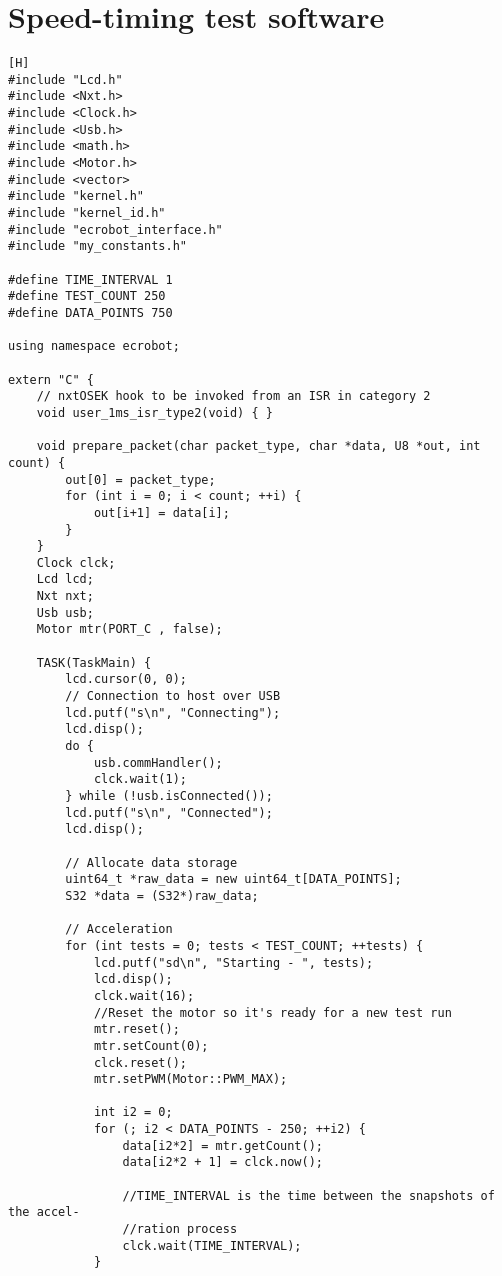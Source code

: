 \chapter{Speed-timing test software}
\begin{lstlisting}[language=inc_cpp, caption={Speed-Timing Test software}, label=lst_speed_timing][H]
#include "Lcd.h"
#include <Nxt.h>
#include <Clock.h>
#include <Usb.h>
#include <math.h>
#include <Motor.h>
#include <vector>
#include "kernel.h"
#include "kernel_id.h"
#include "ecrobot_interface.h"
#include "my_constants.h"

#define TIME_INTERVAL 1
#define TEST_COUNT 250
#define DATA_POINTS 750

using namespace ecrobot;

extern "C" {
    // nxtOSEK hook to be invoked from an ISR in category 2
    void user_1ms_isr_type2(void) { }
    
    void prepare_packet(char packet_type, char *data, U8 *out, int count) {
        out[0] = packet_type;
        for (int i = 0; i < count; ++i) {
            out[i+1] = data[i];
        }
    }
    Clock clck;
    Lcd lcd;
    Nxt nxt;
    Usb usb;
    Motor mtr(PORT_C , false);

    TASK(TaskMain) {
        lcd.cursor(0, 0);
        // Connection to host over USB
        lcd.putf("s\n", "Connecting");
        lcd.disp();
        do {
            usb.commHandler();
            clck.wait(1);
        } while (!usb.isConnected());
        lcd.putf("s\n", "Connected");
        lcd.disp();
        
        // Allocate data storage
        uint64_t *raw_data = new uint64_t[DATA_POINTS];
        S32 *data = (S32*)raw_data;

        // Acceleration
        for (int tests = 0; tests < TEST_COUNT; ++tests) {
            lcd.putf("sd\n", "Starting - ", tests);
            lcd.disp();
            clck.wait(16);
            //Reset the motor so it's ready for a new test run
            mtr.reset();
            mtr.setCount(0);
            clck.reset();
            mtr.setPWM(Motor::PWM_MAX);

            int i2 = 0;
            for (; i2 < DATA_POINTS - 250; ++i2) {
                data[i2*2] = mtr.getCount();
                data[i2*2 + 1] = clck.now();
                
                //TIME_INTERVAL is the time between the snapshots of the accel-
                //ration process
                clck.wait(TIME_INTERVAL);
            }
            

\end{lstlisting}
